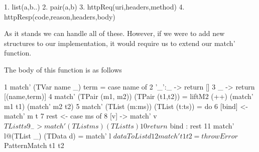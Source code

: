 \label{list:patterns}
\begin{code}
    1. list(a,b..)
    2. pair(a,b)
    3. httpReq(uri,headers,method)
    4. httpResp(code,reason,headers,body)
\end{code}

As it stands we can handle all of these. However, if we were to add new structures to our implementation, it would require us to extend our match' function. 

The body of this function is as follows
\begin{code}
1  match' (TVar name _) term = case name of                                                
2                                 '_':_ -> return []
3                                 _     -> return [(name,term)]
4  match' (TPair (m1, m2)) (TPair (t1,t2)) = 
                    liftM2 (++) (match' m1 t1)  (match' m2 t2)
5  match' (TList (m:ms)) (TList (t:ts)) = do
6                 [bind] <- match' m t
7                 rest <- case ms of
8                    [v] -> match' v $ TList ts
9                    _   -> match' (TList ms) (TList ts)
10                return $ bind : rest
11 match' l@(TList _) (TData d) = match' l $ dataToList d
12 match' t1 t2 = throwError $ PatternMatch t1 t2
\end{code}

